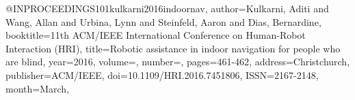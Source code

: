 @INPROCEEDINGS{101kulkarni2016indoornav,
author={Kulkarni, Aditi and Wang, Allan and Urbina, Lynn and Steinfeld, Aaron and Dias, Bernardine},
booktitle={11th ACM/IEEE International Conference on Human-Robot Interaction (HRI)}, 
title={Robotic assistance in indoor navigation for people who are blind}, 
year={2016},
volume={},
number={},
pages={461-462},
address={Christchurch},
publisher={ACM/IEEE},
doi={10.1109/HRI.2016.7451806},
ISSN={2167-2148},
month={March},}